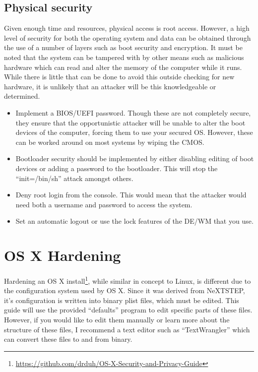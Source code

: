 \documentclass[a4paper,11pt]{report}
\begin{document}
				\subsection{Physical security}
					Given enough time and resources, physical access is root access. 
					However, a high level of security for both the operating system and data can be obtained through the use of a number of layers such as boot security and encryption. 
					It must be noted that the system can be tampered with by other means such as malicious hardware which can read and alter the memory of the computer while it runs. While there is little that can be done to avoid this outside checking for new hardware, it is unlikely that an attacker will be this knowledgeable or determined. 
					\begin{itemize}
						\item Implement a BIOS/UEFI password. 
							Though these are not completely secure, they ensure that the opportunistic attacker will be unable to alter the boot devices of the computer, forcing them to use your secured OS. 
							However, these can be worked around on most systems by wiping the CMOS. 
						\item Bootloader security should be implemented by either disabling editing of boot devices or adding a password to the bootloader. 
							This will stop the ``init=/bin/sh'' attack amongst others. 
						\item Deny root login from the console. 
							This would mean that the attacker would need both a username and password to access the system. 
						\item Set an automatic logout or use the lock features of the DE/WM that you use. 
					\end{itemize}
	\section{OS X Hardening}
		Hardening an OS X install\footnote{\url{https://github.com/drduh/OS-X-Security-and-Privacy-Guide}}, while similar in concept to Linux, is different due to the configuration system used by OS X. 
		Since it was derived from NeXTSTEP, it's configuration is written into binary plist files, which must be edited. 
		This guide will use the provided ``defaults'' program to edit specific parts of these files. 
		However, if you would like to edit them manually or learn more about the structure of these files, I recommend a text editor such as ``TextWrangler'' which can convert these files to and from binary. 
\end{document}
